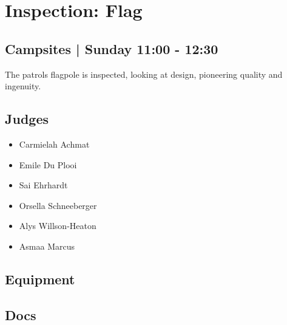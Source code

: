 \documentclass[10pt]{article}
\begin{document}
		\begin{minipage}{\linewidth}
		\setcounter{section}{44}
	\section{Inspection: Flag }
	\subsection*{Campsites | Sunday 11:00 - 12:30}

	The patrols flagpole is inspected, looking at design, pioneering quality and ingenuity.

	\begin{multicols}{2}
	\subsection*{\faUsers \: Judges}
	\begin{itemize}
			\item Carmielah Achmat
			\item Emile Du Plooi
			\item Sai Ehrhardt
			\item Orsella Schneeberger
			\item Alys Willson-Heaton
			\item Asmaa Marcus
		\end{itemize}
	\columnbreak
	\subsection*{\faWrench \: Equipment}
	        \vfill\null
        \subsection*{\faFile \: Docs}
     	\end{multicols}


	\vspace{1cm}
	\end{minipage}
\end{document}
